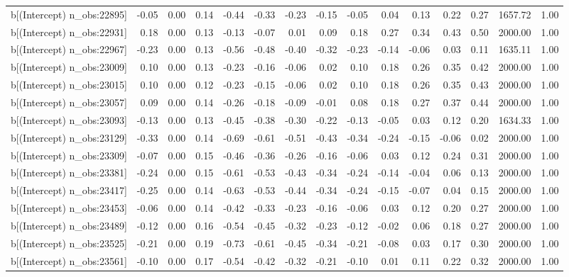 \begin{table}[ht]
\begin{tabular}{rrrrrrrrrrrrrrr}
  b[(Intercept) n\_obs:22895] & -0.05 & 0.00 & 0.14 & -0.44 & -0.33 & -0.23 & -0.15 & -0.05 & 0.04 & 0.13 & 0.22 & 0.27 & 1657.72 & 1.00 \\ 
  b[(Intercept) n\_obs:22931] & 0.18 & 0.00 & 0.13 & -0.13 & -0.07 & 0.01 & 0.09 & 0.18 & 0.27 & 0.34 & 0.43 & 0.50 & 2000.00 & 1.00 \\ 
  b[(Intercept) n\_obs:22967] & -0.23 & 0.00 & 0.13 & -0.56 & -0.48 & -0.40 & -0.32 & -0.23 & -0.14 & -0.06 & 0.03 & 0.11 & 1635.11 & 1.00 \\ 
  b[(Intercept) n\_obs:23009] & 0.10 & 0.00 & 0.13 & -0.23 & -0.16 & -0.06 & 0.02 & 0.10 & 0.18 & 0.26 & 0.35 & 0.42 & 2000.00 & 1.00 \\ 
  b[(Intercept) n\_obs:23015] & 0.10 & 0.00 & 0.12 & -0.23 & -0.15 & -0.06 & 0.02 & 0.10 & 0.18 & 0.26 & 0.35 & 0.43 & 2000.00 & 1.00 \\ 
  b[(Intercept) n\_obs:23057] & 0.09 & 0.00 & 0.14 & -0.26 & -0.18 & -0.09 & -0.01 & 0.08 & 0.18 & 0.27 & 0.37 & 0.44 & 2000.00 & 1.00 \\ 
  b[(Intercept) n\_obs:23093] & -0.13 & 0.00 & 0.13 & -0.45 & -0.38 & -0.30 & -0.22 & -0.13 & -0.05 & 0.03 & 0.12 & 0.20 & 1634.33 & 1.00 \\ 
  b[(Intercept) n\_obs:23129] & -0.33 & 0.00 & 0.14 & -0.69 & -0.61 & -0.51 & -0.43 & -0.34 & -0.24 & -0.15 & -0.06 & 0.02 & 2000.00 & 1.00 \\ 
  b[(Intercept) n\_obs:23309] & -0.07 & 0.00 & 0.15 & -0.46 & -0.36 & -0.26 & -0.16 & -0.06 & 0.03 & 0.12 & 0.24 & 0.31 & 2000.00 & 1.00 \\ 
  b[(Intercept) n\_obs:23381] & -0.24 & 0.00 & 0.15 & -0.61 & -0.53 & -0.43 & -0.34 & -0.24 & -0.14 & -0.04 & 0.06 & 0.13 & 2000.00 & 1.00 \\ 
  b[(Intercept) n\_obs:23417] & -0.25 & 0.00 & 0.14 & -0.63 & -0.53 & -0.44 & -0.34 & -0.24 & -0.15 & -0.07 & 0.04 & 0.15 & 2000.00 & 1.00 \\ 
  b[(Intercept) n\_obs:23453] & -0.06 & 0.00 & 0.14 & -0.42 & -0.33 & -0.23 & -0.16 & -0.06 & 0.03 & 0.12 & 0.20 & 0.27 & 2000.00 & 1.00 \\ 
  b[(Intercept) n\_obs:23489] & -0.12 & 0.00 & 0.16 & -0.54 & -0.45 & -0.32 & -0.23 & -0.12 & -0.02 & 0.06 & 0.18 & 0.27 & 2000.00 & 1.00 \\ 
  b[(Intercept) n\_obs:23525] & -0.21 & 0.00 & 0.19 & -0.73 & -0.61 & -0.45 & -0.34 & -0.21 & -0.08 & 0.03 & 0.17 & 0.30 & 2000.00 & 1.00 \\ 
  b[(Intercept) n\_obs:23561] & -0.10 & 0.00 & 0.17 & -0.54 & -0.42 & -0.32 & -0.21 & -0.10 & 0.01 & 0.11 & 0.22 & 0.32 & 2000.00 & 1.00 \\ 

\end{tabular}
\end{table}
